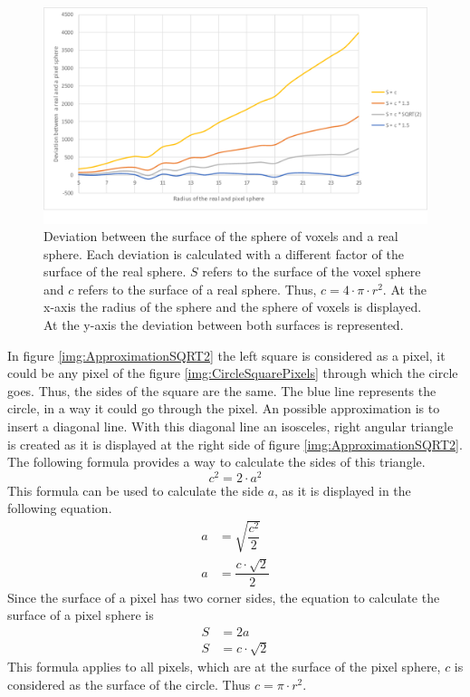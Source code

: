 \begin{figure}
	\center
	\includegraphics[scale=0.3]{figures/DeviationSphereToPixelSphere.png}
	\caption{Deviation between the surface of the sphere of voxels and a real sphere. Each deviation is calculated with a different factor of the surface of the real sphere. $S$ refers to the surface of the voxel sphere and $c$ refers to the surface of a real sphere. Thus, $c = 4 \cdot \pi \cdot r^{2}$. \newline
	At the x-axis the radius of the sphere and the sphere of voxels is displayed. At the y-axis the deviation between both surfaces is represented.}
	\label{img:DeviationSphere}
\end{figure}

In figure \ref{img:ApproximationSQRT2} the left square is considered as a pixel, it could be any pixel of the figure \ref{img:CircleSquarePixels} through which the circle goes. Thus, the sides of the square are the same. The blue line represents the circle, in a way it could go through the pixel. An possible approximation is to insert a diagonal line. With this diagonal line an isosceles, right angular triangle is created as it is displayed at the right side of figure \ref{img:ApproximationSQRT2}. \newline
The following formula provides a way to calculate the sides of this triangle.
\begin{equation}\label{eq:IsoscelesRightAncularTriangle}
c^{2} = 2 \cdot a^{2}
\end{equation}
This formula can be used to calculate the side $a$, as it is displayed in the following equation.
\begin{equation}\label{eq:CornerSideAOfTriangle}
\begin{split}
a &= \sqrt{\dfrac{c^{2}}{2}} \\
a &= \dfrac{c \cdot \sqrt{2}}{2}
\end{split}
\end{equation}
Since the surface of a pixel has two corner sides, the equation to calculate the surface of a pixel sphere is
\begin{equation}\label{eq:PixelSurfaceCalculation}
\begin{split}
S &= 2a \\
S &= c \cdot \sqrt{2}
\end{split}
\end{equation}
This formula applies to all pixels, which are at the surface of the pixel sphere, $c$ is considered as the surface of the circle. Thus $c = \pi \cdot r^{2}$.

